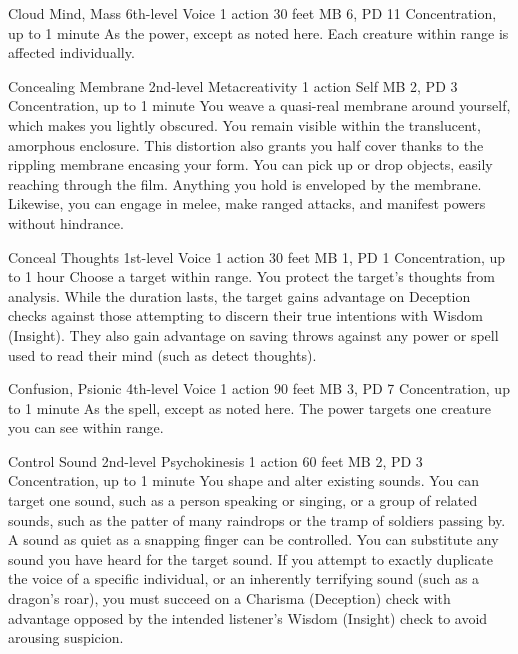 \DndPowerHeader%
  {Cloud Mind, Mass}
  {6th-level Voice}
  {1 action}
  {30 feet}
  {MB 6, PD 11}
  {Concentration, up to 1 minute}
As the  power,
except as noted here.
Each creature within range is affected individually.

\DndPowerHeader%
  {Concealing Membrane}
  {2nd-level Metacreativity}
  {1 action}
  {Self}
  {MB 2, PD 3}
  {Concentration, up to 1 minute}
  You weave a quasi-real membrane around yourself,
  which makes you lightly obscured.
  You remain visible within the translucent, amorphous enclosure.
  This distortion also grants you half cover
  thanks to the rippling membrane encasing your form.
  You can pick up or drop objects, easily reaching through the film.
  Anything you hold is enveloped by the membrane.
  Likewise, you can engage in melee, make ranged attacks,
  and manifest powers without hindrance.

\DndPowerHeader%
  {Conceal Thoughts}
  {1st-level Voice}
  {1 action}
  {30 feet}
  {MB 1, PD 1}
  {Concentration, up to 1 hour}
Choose a target within range.
You protect the target's thoughts from analysis.
While the duration lasts, the target gains advantage on
Deception checks against those attempting to discern their
true intentions with Wisdom (Insight).
They also gain advantage on saving throws against any power or spell
used to read their mind (such as detect thoughts).

\DndPowerHeader%
  {Confusion, Psionic}
  {4th-level Voice}
  {1 action}
  {90 feet}
  {MB 3, PD 7}
  {Concentration, up to 1 minute}
As the  spell, except as noted here.
The power targets one creature you can see within range.

\DndPowerHeader%
  {Control Sound}
  {2nd-level Psychokinesis}
  {1 action}
  {60 feet}
  {MB 2, PD 3}
  {Concentration, up to 1 minute}
  You shape and alter existing sounds.
  You can target one sound, such as a person speaking or singing,
  or a group of related sounds,
  such as the patter of many raindrops or the tramp of soldiers passing by.
  A sound as quiet as a snapping finger can be controlled.
  You can substitute any sound you have heard for the target sound.
  If you attempt to exactly duplicate the voice of a specific individual,
  or an inherently terrifying sound (such as a dragon's roar),
  you must succeed on a Charisma (Deception) check with advantage
  opposed by the intended listener's Wisdom (Insight) check
  to avoid arousing suspicion.

